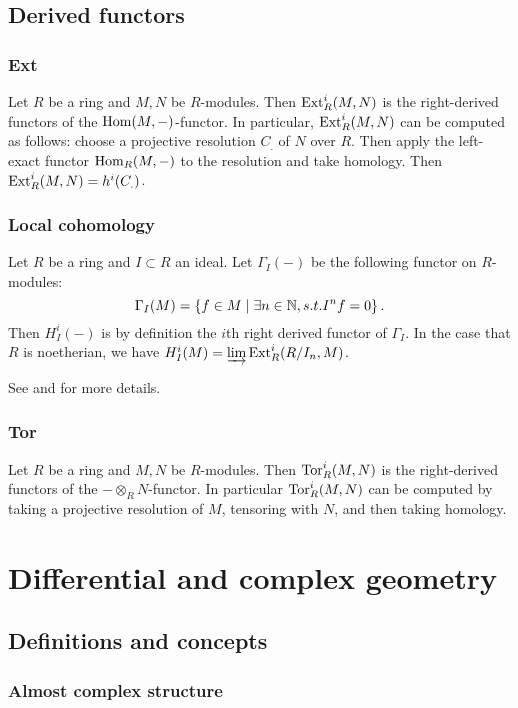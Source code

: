 \documentclass[11pt, english]{article}
\begin{document}
\subsection{Derived functors}
\subsubsection{Ext}
\label{ext}
Let $R$ be a ring and $M,N$ be $R$-modules. Then $\operatorname{\mathrm{Ext}}_R^i(M,N)$ is the right-derived functors of the $\operatorname{Hom}(M,-)$-functor. In particular, $\operatorname{\mathrm{Ext}}^i_R(M,N)$ can be computed as follows: choose a projective resolution $C_.$ of $N$ over $R$. Then apply the left-exact functor $\operatorname{Hom}_R(M,-)$ to the resolution and take homology. Then $\operatorname{\mathrm{Ext}}_R^i(M,N)=h^i(C_.)$.

\subsubsection{Local cohomology}
\label{localcohomology}
Let $R$ be a ring and $I \subset R$ an ideal. Let $\Gamma_I(-)$ be the following functor on $R$-modules:
\[
\Gamma_I(M) = \left\{ f \in M \mid \exists n \in \mathbb{N}, s.t. I^n f = 0 \right \}.
\]
Then $H_I^i(-)$ is by definition the $i$th right derived functor of $\Gamma_I$.  In the case that $R$ is noetherian, we have $H_I^i(M) = \varinjlim \operatorname{\mathrm{Ext}}^i_R(R/I_n,M)$.

See \cite{eisenbud} and \cite{weibel} for more details. 

\subsubsection{Tor}
\label{tor}
Let $R$ be a ring and $M,N$ be $R$-modules. Then $\operatorname{\mathrm{Tor}}_R^i(M,N)$ is the right-derived functors of the $- \otimes_R N$-functor. In particular $\operatorname{\mathrm{Tor}}_R^i(M,N)$ can be computed by taking a projective resolution of $M$, tensoring with $N$, and then taking homology.

\section{Differential and complex geometry}
\subsection{Definitions and concepts}

\subsubsection{Almost complex structure}
\label{almostcomplex}
\end{document}
